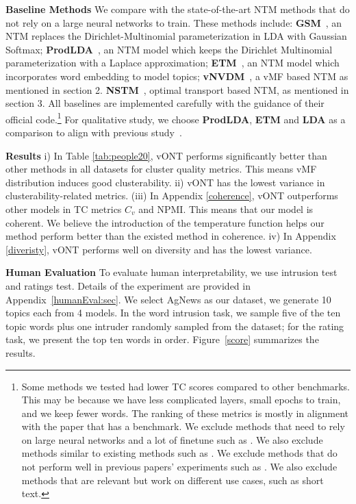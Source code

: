 \documentclass[11pt]{article}
\begin{document}
\textbf{Baseline Methods}
We compare with the state-of-the-art NTM methods that do not rely on a large neural networks to train. These methods include: \textbf{GSM}~\cite{miao2018discovering}, an NTM replaces the Dirichlet-Multinomial parameterization in LDA with Gaussian Softmax; \textbf{ProdLDA}~\cite{srivastava2017autoencoding}, an NTM model which keeps the Dirichlet Multinomial parameterization with a Laplace approximation; \textbf{ETM}~\cite{dieng2020topic}, an NTM model which incorporates word embedding to model topics; \textbf{vNVDM}~\cite{xu2018spherical}, a vMF based NTM as mentioned in section 2. \textbf{NSTM}~\cite{zhao2020neural}, optimal transport based NTM, as mentioned in section 3. All baselines are implemented carefully with the guidance of their official code.\footnote{Some methods we tested had lower TC scores compared to other benchmarks. This may be because we have less complicated layers, small epochs to train, and we keep fewer words. The ranking of these metrics is mostly in alignment with the paper that has a benchmark. We exclude methods that need to rely on large neural networks and a lot of finetune such as \cite{duan2021sawtooth,duan2021topicnet}. We also exclude methods similar to existing methods such as \cite{Wang2022RepresentingMO}. We exclude methods that do not perform well in previous papers' experiments \cite{duan2021sawtooth} such as \cite{JMLR:v20:18-569}. We also exclude methods that are relevant but work on different use cases, such as short text.\cite{wu-etal-2020-short}} 
For qualitative study, we choose \textbf{ProdLDA}, \textbf{ETM} and \textbf{LDA} as a comparison to align with previous study~\cite{hoyle2021automated}.


\textbf{Results} i) In Table \ref{tab:people20}, vONT performs significantly better than other methods in all datasets for cluster quality metrics. This means vMF distribution induces good clusterability.   ii) vONT has the lowest variance in clusterability-related metrics. (iii) In Appendix \ref{coherence}, vONT outperforms other models in TC metrics $C_v$ and NPMI. This means that our model is coherent. We believe the introduction of the temperature function helps our method perform better than the existed method in coherence. iv) In Appendix \ref{diveristy}, vONT performs well on diversity and has the lowest variance.

\textbf{Human Evaluation} To evaluate human interpretability, we use intrusion test and ratings test. Details of the experiment are provided in Appendix~\ref{humanEval:sec}. We select AgNews as our dataset, we generate 10 topics each from 4 models. In the word intrusion task, we sample five of the ten topic words plus one intruder randomly sampled from the dataset; for the rating task, we present the top ten words in order. Figure~\ref{score} summarizes the results.
\end{document}
